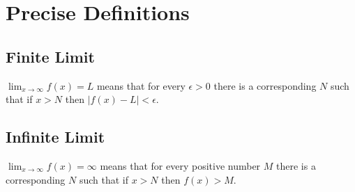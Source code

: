 \documentclass[letterpaper]{exam}
\begin{document}
  \section{Precise Definitions}

  \subsection{Finite Limit}
  $\lim_{x \to \infty} f(x) = L$ means that for every $\epsilon > 0$ there is a corresponding
  $N$ such that if $x > N$ then $|f(x) - L| < \epsilon$.

  \subsection{Infinite Limit}
  $\lim_{x \to \infty} f(x) = \infty$ means that for every positive number $M$ there is a corresponding
  $N$ such that if $x > N$ then $f(x) > M$.
\end{document}
